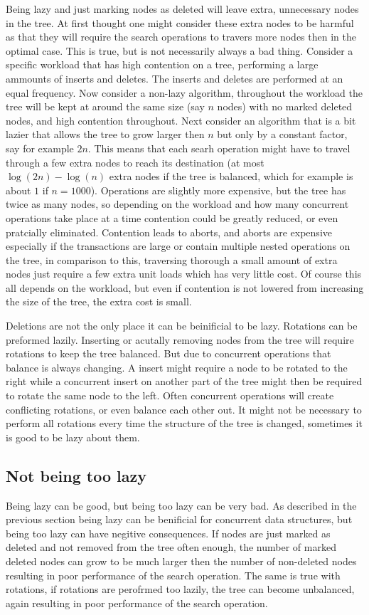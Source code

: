 \documentclass[10pt]{sigplanconf}
\begin{document}
Being lazy and just marking nodes as deleted will leave extra, unnecessary nodes in the tree.
At first thought one might consider these extra nodes to be harmful as that they will require the search operations to travers more nodes then in the optimal case.
This is true, but is not necessarily always a bad thing.
Consider a specific workload that has high contention on a tree, performing a large ammounts of inserts and deletes.
The inserts and deletes are performed at an equal frequency.
Now consider a non-lazy algorithm, throughout the workload the tree will be kept at around the same size (say $n$ nodes) with no marked deleted nodes, and high contention throughout.
Next consider an algorithm that is a bit lazier that allows the tree to grow larger then $n$ but only by a constant factor, say for example $2n$.
This means that each searh operation might have to travel through a few extra nodes to reach its destination (at most $\log(2n) - \log(n)$ extra nodes if the tree is balanced,
which for example is about $1$ if $n = 1000$).
Operations are slightly more expensive, but the tree has twice as many nodes, so depending on the workload and how many concurrent operations take place at a time
contention could be greatly reduced, or even pratcially eliminated.
Contention leads to aborts, and aborts are expensive especially if the transactions are large or contain multiple nested operations on the tree, in comparison to this, traversing
thorough a small amount of extra nodes just require a few extra unit loads which has very little cost.
Of course this all depends on the workload, but even if contention is not lowered from increasing the size of the tree, the extra cost is small.

Deletions are not the only place it can be beinificial to be lazy.
Rotations can be preformed lazily.
Inserting or acutally removing nodes from the tree will require rotations to keep the tree balanced.
But due to concurrent operations that balance is always changing.
A insert might require a node to be rotated to the right while a concurrent insert on another part of the tree might then be required to rotate the same node to the left.
Often concurrent operations will create conflicting rotations, or even balance each other out.
It might not be necessary to perform all rotations every time the structure of the tree is changed, sometimes it is good to be lazy about them.

\subsection{Not being too lazy}
Being lazy can be good, but being too lazy can be very bad.
As described in the previous section being lazy can be benificial for concurrent data structures, but being too lazy can have negitive consequences.
If nodes are just marked as deleted and not removed from the tree often enough, the number of marked deleted nodes can grow to be much larger then the
number of non-deleted nodes resulting in poor performance of the search operation.
The same is true with rotations, if rotations are perofrmed too lazily, the tree can become unbalanced, again resulting in poor performance of the search operation.
\end{document}

